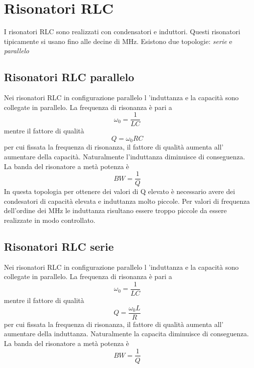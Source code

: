 \documentclass[10pt,a4paper]{book}
\begin{document}
\section{Risonatori RLC}
I risonatori RLC sono realizzati con condensatori e induttori. Questi risonatori tipicamente si usano fino alle decine di MHz. Esistono due topologie: \emph{serie} e \emph{parallelo}
\subsection{Risonatori RLC parallelo}
Nei risonatori RLC in configurazione parallelo l 'induttanza e la capacità sono collegate in parallelo.
La frequenza di risonanza è pari a
\begin{equation}
\omega_0 = \frac{1}{L C}
\end{equation}
mentre il fattore di qualità 
\begin{equation}
Q = \omega_0 R C
\end{equation}
per cui fissata la frequenza di risonanza, il fattore di qualità aumenta all' aumentare della capacità. Naturalmente l'induttanza diminuisce di conseguenza.
La banda del risonatore a metà potenza è
\begin{equation}
BW  = \frac{1}{Q}
\end{equation}
In questa topologia per ottenere dei valori di Q elevato è necessario avere dei condesatori di capacità elevata e induttanza molto piccole. Per valori di frequenza dell'ordine dei MHz le induttanza risultano essere troppo piccole da essere realizzate in modo controllato. 
\subsection{Risonatori RLC serie}
Nei risonatori RLC in configurazione parallelo l 'induttanza e la capacità sono collegate in parallelo.
La frequenza di risonanza è pari a
\begin{equation}
\omega_0 = \frac{1}{L C}
\end{equation}
mentre il fattore di qualità 
\begin{equation}
Q = \frac{\omega_0 L}{R}
\end{equation}
per cui fissata la frequenza di risonanza, il fattore di qualità aumenta all' aumentare della induttanza. Naturalmente la capacita  diminuisce di conseguenza.
La banda del risonatore a metà potenza è
\begin{equation}
BW  = \frac{1}{Q}
\end{equation}
\end{document}
